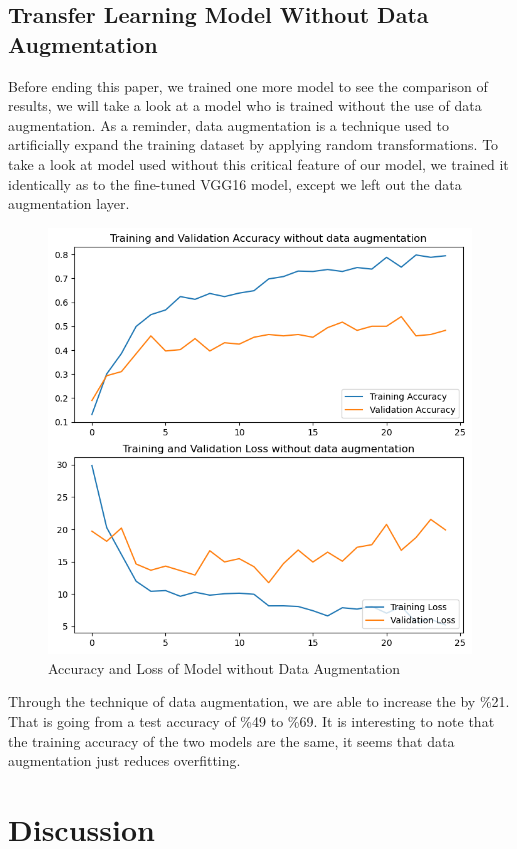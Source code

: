 \documentclass[12pt]{article}
\begin{document}
\subsection{Transfer Learning Model Without Data Augmentation}
Before ending this paper, we trained one more model to see the comparison of results, we will take a look at a model who is trained without the use of data augmentation. As a reminder,
data augmentation is a technique used to artificially expand the training dataset by applying random transformations. To take a look at model used without this critical feature of our model, we trained it identically as 
to the fine-tuned VGG16 model, except we left out the data augmentation layer.\\
\begin{figure}[H]
    \centering
    \includegraphics*[scale=0.5]{images/loss+acc no aug.png}\\
    Accuracy and Loss of Model without Data Augmentation
\end{figure}
Through the technique of data augmentation, we are able to increase the by \%21. That is going from a test accuracy of \%49 to \%69. It is interesting to note that the training accuracy of the two models are the same, it seems that data augmentation just reduces overfitting.

\section{Discussion}
\end{document}
